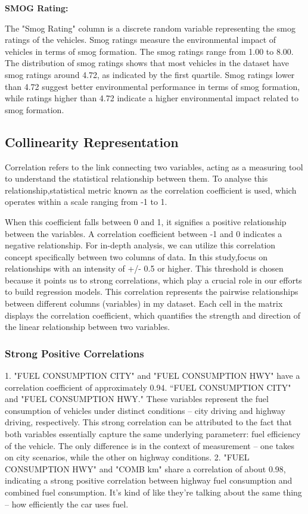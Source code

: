 \documentclass[12pt, a4paper,oneside]{book}
\numberwithin{equation}{section}
\begin{document}
\hfill \break
\textbf{SMOG Rating:}

The "Smog Rating" column is a discrete random variable representing the smog ratings of the vehicles. Smog ratings measure the environmental impact of vehicles in terms of smog formation. The smog ratings range from 1.00 to 8.00.
The distribution of smog ratings shows that most vehicles in the dataset have smog ratings around 4.72, as indicated by the first quartile. Smog ratings lower than 4.72 suggest better environmental performance in terms of smog formation, while ratings higher than 4.72 indicate a higher environmental impact related to smog formation.









\subsection{Collinearity Representation}

Correlation refers to the link connecting two variables, acting as a measuring tool to understand the statistical relationship between them. To analyse this relationship,statistical metric known as the correlation coefficient is used, which operates within a scale ranging from -1 to 1. 

When this coefficient falls between 0 and 1, it signifies a positive relationship between the variables. A correlation coefficient between -1 and 0 indicates a negative relationship. 
For in-depth analysis, we can utilize this correlation concept specifically between two columns of data. In this study,focus on relationships with an intensity of +/- 0.5 or higher. This threshold is chosen because it points us to strong correlations, which play a crucial role in our efforts to build regression models. This correlation represents the pairwise relationships between different columns (variables) in my dataset. Each cell in the matrix displays the correlation coefficient, which quantifies the strength and direction of the linear relationship between two variables. 


\subsubsection{Strong Positive Correlations}
1. "FUEL CONSUMPTION CITY" and "FUEL CONSUMPTION HWY" have a correlation coefficient of approximately 0.94. “FUEL CONSUMPTION CITY" and "FUEL CONSUMPTION HWY." These variables represent the fuel consumption of vehicles under distinct conditions – city driving and highway driving, respectively. This strong correlation can be attributed to the fact that both variables essentially capture the same underlying parameterr: fuel efficiency of the vehicle. The only difference is in the context of measurement – one takes on city scenarios, while the other on highway conditions. 
2. "FUEL CONSUMPTION HWY" and "COMB km" share a correlation of about 0.98, indicating a strong positive correlation between highway fuel consumption and combined fuel consumption. It's kind of like they're talking about the same thing – how efficiently the car uses fuel. 
\end{document}
